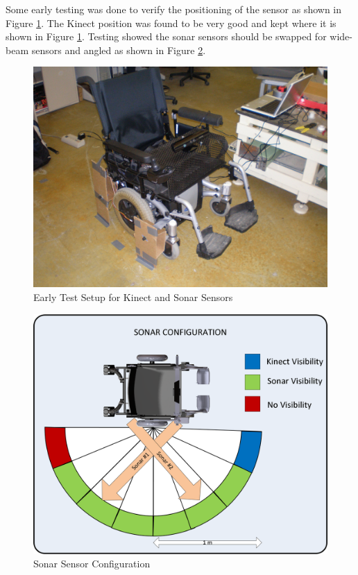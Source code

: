\documentclass[oneside,final,a4paper]{report}
\begin{document}
Some early testing was done to verify the positioning of the sensor as shown in Figure \ref{fig:testing}. The Kinect position was found to be very good and kept where it is shown in Figure \ref{fig:testing}. Testing showed the sonar sensors should be swapped for wide-beam sensors and angled as shown in Figure \ref{fig:sonar_config}.
\begin{figure}[hbt]
 \centering
 \includegraphics[scale=0.1]{testing}
 \caption{Early Test Setup for Kinect and Sonar Sensors}\label{fig:testing}
\end{figure}
\begin{figure}[hbt]
 \centering
 \includegraphics[scale=0.55]{SONAR_Config_Final_Report}
 \caption{Sonar Sensor Configuration}\label{fig:sonar_config}
\end{figure}
\end{document}
